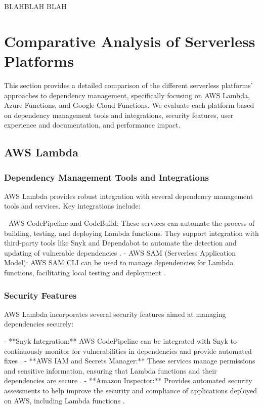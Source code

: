 \documentclass[sigconf]{acmart}
\begin{document}
BLAHBLAH BLAH 

\section{Comparative Analysis of Serverless Platforms}

This section provides a detailed comparison of the different serverless platforms' approaches to dependency management, specifically focusing on AWS Lambda, Azure Functions, and Google Cloud Functions. We evaluate each platform based on dependency management tools and integrations, security features, user experience and documentation, and performance impact.

\subsection{AWS Lambda}

\subsubsection{Dependency Management Tools and Integrations}

AWS Lambda provides robust integration with several dependency management tools and services. Key integrations include:

- AWS CodePipeline and CodeBuild: These services can automate the process of building, testing, and deploying Lambda functions. They support integration with third-party tools like Snyk and Dependabot to automate the detection and updating of vulnerable dependencies \cite{awsCI2023}.
- AWS SAM (Serverless Application Model): AWS SAM CLI can be used to manage dependencies for Lambda functions, facilitating local testing and deployment \cite{awssam2023}.

\subsubsection{Security Features}

AWS Lambda incorporates several security features aimed at managing dependencies securely:

- **Snyk Integration:** AWS CodePipeline can be integrated with Snyk to continuously monitor for vulnerabilities in dependencies and provide automated fixes \cite{snykaws2023}.
- **AWS IAM and Secrets Manager:** These services manage permissions and sensitive information, ensuring that Lambda functions and their dependencies are secure \cite{awsSecurity2023}.
- **Amazon Inspector:** Provides automated security assessments to help improve the security and compliance of applications deployed on AWS, including Lambda functions \cite{awsinspector2023}.
\end{document}
